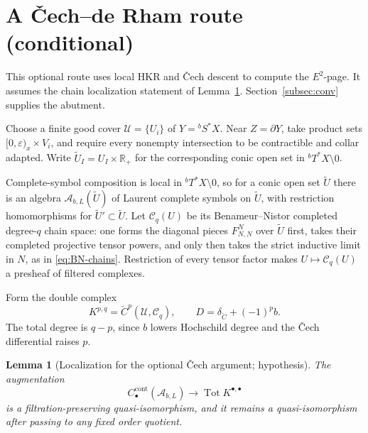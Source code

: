 \documentclass[11pt,oneside,reqno]{article}
\newcommand{\cA}{\mathcal A}
\newcommand{\Sbstar}{{}^{b}S^*X}
\newcommand{\Tbstar}{{}^{b}T^*X}
\theoremstyle{plain}
\newtheorem{lemma}[theorem]{Lemma}
\theoremstyle{definition}
\theoremstyle{remark}
\begin{document}
\section{A \v Cech--de Rham route (conditional)}\label{sec:cech}

This optional route uses local HKR and \v Cech descent to compute the
\(E^2\)-page. It assumes the chain localization statement of
Lemma~\ref{lem:cech-descent}. Section~\ref{subsec:conv} supplies
the abutment.

Choose a finite good cover \(\mathcal U=\{U_i\}\) of
\(Y=\Sbstar\).  Near \(Z=\partial Y\), take product sets
\([0,\varepsilon)_x\times V_i\), and require every nonempty intersection to
be contractible and collar adapted.  Write
\(\widetilde U_I=U_I\times\mathbb R_+\) for the corresponding conic open set
in \(\Tbstar\setminus0\).

Complete-symbol composition is local in \(\Tbstar\setminus0\), so for a
conic open set \(\widetilde U\) there is an algebra
\(\cA_{b,L}(\widetilde U)\) of Laurent complete symbols on
\(\widetilde U\), with restriction homomorphisms for
\(\widetilde U'\subset\widetilde U\). Let \(\mathcal C_q(U)\) be its
Benameur--Nistor completed degree-\(q\) chain space: one forms the diagonal
pieces \(F^N_{N,N}\) over \(\widetilde U\) first, takes their completed
projective tensor powers, and only then takes the strict inductive limit in
\(N\), as in \eqref{eq:BN-chains}. Restriction of every tensor factor makes
\(U\mapsto\mathcal C_q(U)\) a presheaf of filtered complexes.

Form the double complex
\begin{equation}\label{eq:cech-double}
 K^{p,q}=\check C^p(\mathcal U,\mathcal C_q),
 \qquad
 D=\delta_{\check C}+(-1)^p b.
\end{equation}
The total degree is \(q-p\), since \(b\) lowers Hochschild degree and the
\v Cech differential raises \(p\).

\begin{lemma}[Localization for the optional \v Cech argument; hypothesis]\label{lem:cech-descent}
The augmentation
\[
 C_\bullet^{\mathrm{cont}}(\cA_{b,L})
 \longrightarrow \operatorname{Tot}K^{\bullet,\bullet}
\]
is a filtration-preserving quasi-isomorphism, and it remains a
quasi-isomorphism after passing to any fixed order quotient.
\end{lemma}
\end{document}
